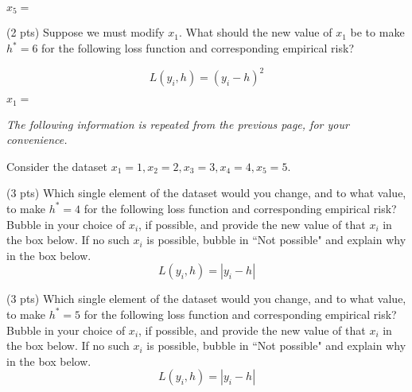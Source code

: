 \documentclass[twoside,12pt]{article}
\begin{document}
\begin{probset}
\begin{prob}
\begin{subprobset}
\begin{subprob}
        \begin{center}
            $x_5 = $\inlineresponsebox[3in]{}
        \end{center}
    \end{subprob}
    
    \begin{subprob}(2 pts)
        Suppose we must modify $x_1$. What should the new value of $x_1$ be to make \( h^* = 6 \) for the following loss function and corresponding empirical risk? 

        \vspace{-0.3cm}
        $$L(y_i, h) = (y_i - h)^2$$
        \begin{center}
            $x_1 = $\inlineresponsebox[3in]{}
        \end{center}
    \end{subprob}

\end{subprobset}

\newpage 
\textit{The following information is repeated from the previous page, for your convenience.} 

Consider the dataset $x_1 = 1, x_2 = 2, x_3 = 3, x_4 = 4, x_5 = 5$.

\begin{subprobset}

    \begin{subprob}(3 pts)
        Which single element of the dataset would you change, and to what value, to make \( h^* = 4 \) for the following loss function and corresponding empirical risk? Bubble in your choice of $x_i$, if possible, and provide the new value of that $x_i$ in the box below. If no such $x_i$ is possible, bubble in ``Not possible" and explain why in the box below.
$$L(y_i, h) = |y_i - h|$$
        \begin{center}
        \end{center}
        \begin{responsebox}{0.75in}
            
        \end{responsebox}
    \end{subprob}
    
    \begin{subprob}(3 pts)
        Which single element of the dataset would you change, and to what value, to make \( h^* = 5 \) for the following loss function and corresponding empirical risk? Bubble in your choice of $x_i$, if possible, and provide the new value of that $x_i$ in the box below. If no such $x_i$ is possible, bubble in ``Not possible" and explain why in the box below.
$$L(y_i, h) = |y_i - h|$$


\end{subprob}
\end{subprobset}
\end{prob}
\end{probset}
\end{document}
